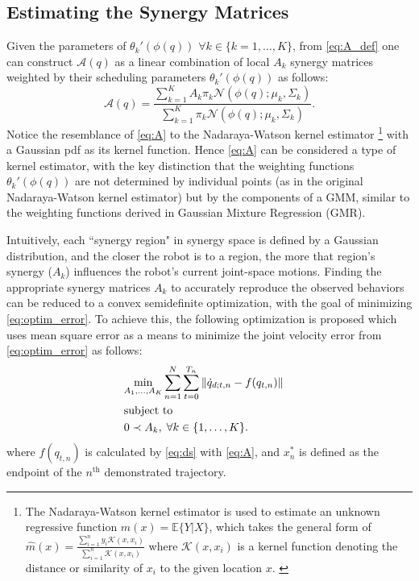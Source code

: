 \documentclass[letterpaper, 10 pt, conference,fleqn]{ieeeconf}
\begin{document}
\subsection{Estimating the Synergy Matrices}
Given the parameters of $\theta_k'(\phi(q))$ $\forall k \in \{k=1,\dots,K\}$, from \eqref{eq:A_def} one can construct $\mathcal{A}(q)$ as a linear combination of local $A_k$ synergy matrices weighted by their scheduling parameters $\theta_k'(\phi(q))$ as follows: 
\begin{equation}
\label{eq:A}
\mathcal{A}(q) = \frac{\sum_{k=1}^K A_k \pi_k\mathcal{N}(\phi(q); \mu_k, \Sigma_k)}{\sum_{k=1}^K \pi_k\mathcal{N} (\phi(q); \mu_k, \Sigma_k)}.
\end{equation} 
Notice the resemblance of \eqref{eq:A} to the Nadaraya-Watson kernel estimator \cite{nadaraya1964regress,watson1964regress}\footnote{The Nadaraya-Watson kernel estimator is used to estimate an unknown regressive function $m(x) = \mathbb{E}\{Y|X\}$, which takes the general form of $\widehat{m}(x) = \frac{\sum_{i=1}^n y_i \mathcal{K}(x,x_i)}{\sum_{i=1}^n \mathcal{K}(x,x_i)}$ where $\mathcal{K}(x,x_i)$ is a kernel function denoting the distance or similarity of $x_i$ to the given location $x$. \cite{nadaraya1964regress,watson1964regress}} with a Gaussian pdf as its kernel function. Hence \eqref{eq:A} can be considered a type of kernel estimator, with the key distinction that the weighting functions $\theta_k'(\phi(q))$ are not determined by individual points (as in the original Nadaraya-Watson kernel estimator) but by the components of a GMM, similar to the weighting functions derived in Gaussian Mixture Regression (GMR). 

Intuitively, each ``synergy region" in synergy space is defined by a Gaussian distribution, and the closer the robot is to a region, the more that region's synergy ($A_k$) influences the robot's current joint-space motions. Finding the appropriate synergy matrices $A_k$ to accurately reproduce the observed behaviors can be reduced to a convex semidefinite optimization, with the goal of minimizing \eqref{eq:optim_error}. To achieve this, the following optimization is proposed which uses mean square error as a means to minimize the joint velocity error from \eqref{eq:optim_error} as follows:
\begin{equation}
\vspace{-10pt}
\begin{aligned}
&\underset{A_1, \dots, A_K}{\text{min}} 
\sum_{n=1}^N\sum_{t=0}^{T_n} \left \| \dot{q}_{d;t,n} - f(q_{t,n}) \right \| \\
& \text{subject to}&\\
&  0 \prec A_k, \; \forall k \in \{1, \dots, K\}. &
\end{aligned}
\label{eq:opt}
\end{equation}
where $f(q_{t,n})$ is calculated by %
 \eqref{eq:ds} with \eqref{eq:A}, and $x^*_{n}$ is defined as the endpoint of the $ n^{\text{th}} $ demonstrated trajectory.
\end{document}
